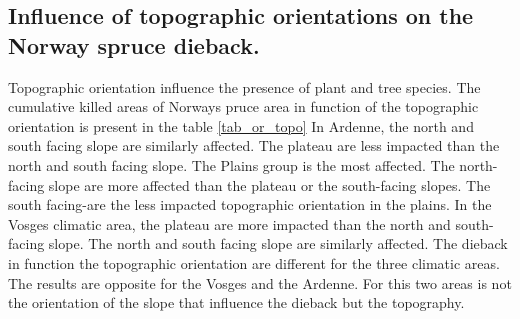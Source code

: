 \documentclass[3p,procedia]{elsarticle}
\begin{document}


	


\subsection{Influence of topographic orientations on the Norway spruce dieback.}

Topographic orientation influence the presence of plant and tree species.
The cumulative killed areas of Norways pruce area in function of the topographic orientation is present in the table \ref{tab_or_topo}
In Ardenne, the north and south facing slope are similarly affected. 
The plateau are less impacted than the north and south facing slope.
The Plains group is the most affected. 
The north-facing slope are more affected than the plateau or the south-facing slopes.
The south facing-are the less impacted topographic orientation in the plains.
In the Vosges climatic area, the plateau are more impacted than the north and south-facing slope.
The north and south facing slope are similarly affected.
The dieback in function the topographic orientation are different for the three climatic areas.
The results are opposite for the Vosges and the Ardenne.
For this two areas is not the orientation of the slope that influence the dieback but the topography.
\end{document}
